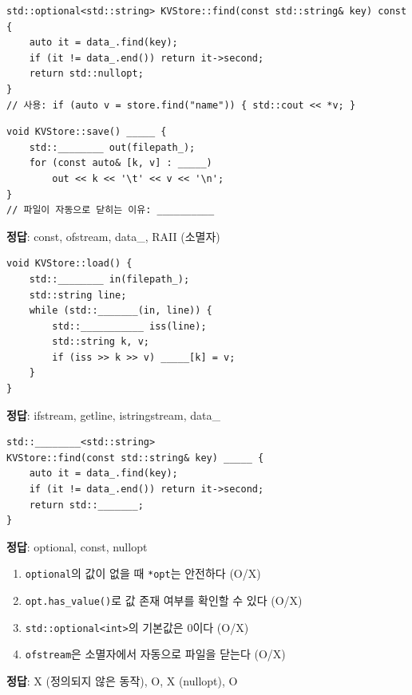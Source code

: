 \documentclass[11pt,a4paper]{article}
\newcommand{\code}[1]{\texttt{#1}}
\begin{document}
\begin{lstlisting}[style=cpp,title={optional 사용}]
std::optional<std::string> KVStore::find(const std::string& key) const {
    auto it = data_.find(key);
    if (it != data_.end()) return it->second;
    return std::nullopt;
}
// 사용: if (auto v = store.find("name")) { std::cout << *v; }
\end{lstlisting}

\begin{quizbox}[title={Q2-1: save()}]
\begin{lstlisting}[style=cpp,numbers=none]
void KVStore::save() _____ {
    std::________ out(filepath_);
    for (const auto& [k, v] : _____)
        out << k << '\t' << v << '\n';
}
// 파일이 자동으로 닫히는 이유: __________
\end{lstlisting}
\textbf{정답}: const, ofstream, data\_, RAII (소멸자)
\end{quizbox}

\begin{quizbox}[title={Q2-2: load()}]
\begin{lstlisting}[style=cpp,numbers=none]
void KVStore::load() {
    std::________ in(filepath_);
    std::string line;
    while (std::_______(in, line)) {
        std::___________ iss(line);
        std::string k, v;
        if (iss >> k >> v) _____[k] = v;
    }
}
\end{lstlisting}
\textbf{정답}: ifstream, getline, istringstream, data\_
\end{quizbox}

\begin{quizbox}[title={Q2-3: optional}]
\begin{lstlisting}[style=cpp,numbers=none]
std::________<std::string>
KVStore::find(const std::string& key) _____ {
    auto it = data_.find(key);
    if (it != data_.end()) return it->second;
    return std::_______;
}
\end{lstlisting}
\textbf{정답}: optional, const, nullopt
\end{quizbox}

\begin{quizbox}[title={Q2-4: O/X}]
\begin{enumerate}[nosep]
\item \code{optional}의 값이 없을 때 \code{*opt}는 안전하다 (O/X)
\item \code{opt.has\_value()}로 값 존재 여부를 확인할 수 있다 (O/X)
\item \code{std::optional<int>}의 기본값은 0이다 (O/X)
\item \code{ofstream}은 소멸자에서 자동으로 파일을 닫는다 (O/X)
\end{enumerate}
\textbf{정답}: X (정의되지 않은 동작), O, X (nullopt), O
\end{quizbox}
\end{document}
